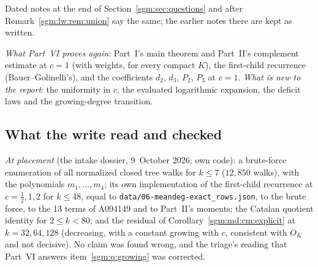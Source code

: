 \documentclass[11pt,letterpaper]{article}
\theoremstyle{remark}\newtheorem{remark}[theorem]{Remark}
\newcommand{\file}[1]{\nolinkurl{#1}}
\theoremstyle{definition}\newtheorem{definition}[theorem]{Definition}
\begin{document}
Dated notes at the end of Section~\ref{sgm:sec:questions} and after
Remark~\ref{sgm:lw:rem:union} say the same; the earlier notes there are kept
as written.

\emph{What Part~VI proves again}: Part~I's main theorem and Part~II's
complement estimate at $c=1$ (with weights, for every compact $K$), the
first-child recurrence (Bauer--Golinelli's), and the coefficients $d_2$,
$d_3$, $P_2$, $P_3$ at $c=1$. \emph{What is new to the report}: the
uniformity in $c$, the evaluated logarithmic expansion, the deficit laws and
the growing-degree transition.

\subsection{What the write read and checked}\label{sgm:md:sec:checks}

\emph{At placement} (the intake dossier, 9~October 2026; own code): a
brute-force enumeration of all normalized closed tree walks for $k\le7$
($12{,}850$ walks), with the polynomials $m_1,\dots,m_4$; its own
implementation of the first-child recurrence at $c=\frac12,1,2$ for
$k\le48$, equal to \file{data/06-meandeg-exact_rows.json}, to the brute force,
to the 13 terms of A094149 and to Part~II's moments; the Catalan quotient
identity for $2\le k<80$; and the residual of
Corollary~\ref{sgm:md:cm:explicit} at $k=32,64,128$ (decreasing, with a
constant growing with $c$, consistent with $O_K$ and not decisive). No claim
was found wrong, and the triage's reading that Part~VI answers
item~\ref{sgm:q:growing} was corrected.
\end{document}
